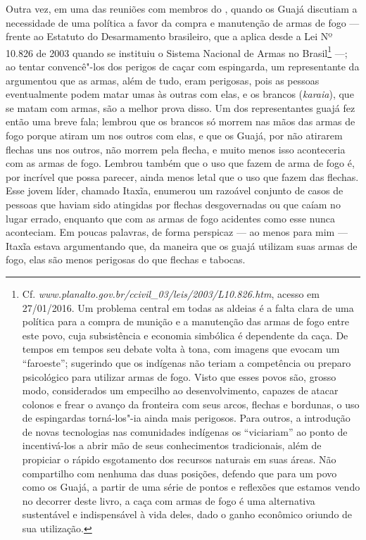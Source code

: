 Outra vez, em uma das reuniões com membros do , quando os Guajá
discutiam a necessidade de uma política a favor da compra e manutenção
de armas de fogo --- frente ao Estatuto do Desarmamento brasileiro, que a
 aplica desde a Lei Nº 10.826 de 2003 quando se instituiu o Sistema
Nacional de Armas no Brasil\footnote{Cf. \emph{www.planalto.gov.br/ccivil\_03/leis/2003/L10.826.htm},
  acesso em 27/01/2016. Um problema central em todas as aldeias é a
  falta clara de uma política para a compra de munição e a manutenção
  das armas de fogo entre este povo, cuja subsistência e economia
  simbólica é dependente da caça. De tempos em tempos seu debate volta à
  tona, com imagens que evocam um ``faroeste''; sugerindo que os
  indígenas não teriam a competência ou preparo psicológico para
  utilizar armas de fogo. Visto que esses povos são, grosso modo,
  considerados um empecilho ao desenvolvimento, capazes de atacar
  colonos e frear o avanço da fronteira com seus arcos, flechas e
  bordunas, o uso de espingardas torná-los"-ia ainda mais perigosos. Para
  outros, a introdução de novas tecnologias nas comunidades indígenas os
  ``viciariam'' ao ponto de incentivá-los a abrir mão de seus
  conhecimentos tradicionais, além de propiciar o rápido esgotamento dos
  recursos naturais em suas áreas. Não compartilho com nenhuma das duas
  posições, defendo que para um povo como os Guajá, a partir de uma
  série de pontos e reflexões que estamos vendo no decorrer deste livro,
  a caça com armas de fogo é uma alternativa sustentável e indispensável
  à vida deles, dado o ganho econômico oriundo de sua utilização.} ---; ao
tentar convencê"-los dos perigos de caçar com espingarda, um
representante da  argumentou que as armas, além de tudo, eram
perigosas, pois as pessoas eventualmente podem matar umas às outras com
elas, e os brancos (\emph{karaia}), que se matam com armas, são a melhor
prova disso. Um dos representantes guajá fez então uma breve fala;
lembrou que os brancos só morrem nas mãos das armas de fogo porque
atiram um nos outros com elas, e que os Guajá, por não atirarem flechas
uns nos outros, não morrem pela flecha, e muito menos isso aconteceria
com as armas de fogo. Lembrou também que o uso que fazem de arma de fogo
é, por incrível que possa parecer, ainda menos letal que o uso que fazem
das flechas. Esse jovem líder, chamado Itaxĩa, enumerou um razoável
conjunto de casos de pessoas que haviam sido atingidas por flechas
desgovernadas ou que caíam no lugar errado, enquanto que com as armas de
fogo acidentes como esse nunca aconteciam. Em poucas palavras, de forma
perspicaz --- ao menos para mim --- Itaxĩa estava argumentando que, da
maneira que os guajá utilizam suas armas de fogo, elas são menos
perigosas do que flechas e tabocas.


